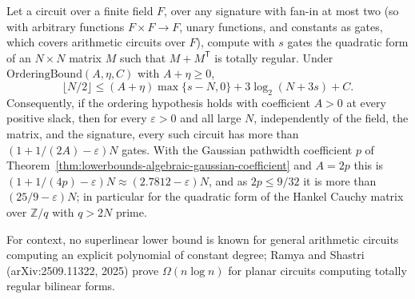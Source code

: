 \begin{theorem}
  \label{thm:lowerbounds-algebraic-quadratic}
  \leanok
  Let a circuit over a finite field $F$, over any signature with fan-in at
  most two (so with arbitrary functions $F\times F\to F$, unary functions,
  and constants as gates, which covers arithmetic circuits over $F$), compute
  with $s$ gates the quadratic form of an $N\times N$ matrix $M$ such that
  $M+M^{\mathsf T}$ is totally regular. Under
  $\mathrm{OrderingBound}(A,\eta,C)$ with $A+\eta\ge0$,
  \[
    \lfloor N/2\rfloor \le (A+\eta)\max\{s-N,0\} + 3\log_2(N+3s) + C .
  \]
  Consequently, if the ordering hypothesis holds with coefficient $A>0$ at
  every positive slack, then for every $\varepsilon>0$ and all large $N$,
  independently of the field, the matrix, and the signature, every such
  circuit has more than $(1+1/(2A)-\varepsilon)N$ gates. With the Gaussian
  pathwidth coefficient $p$ of
  Theorem~\ref{thm:lowerbounds-algebraic-gaussian-coefficient} and $A=2p$
  this is $(1+1/(4p)-\varepsilon)N\approx(2.7812-\varepsilon)N$, and as
  $2p\le9/32$ it is more than $(25/9-\varepsilon)N$; in particular for the
  quadratic form of the Hankel Cauchy matrix over $\mathbb{Z}/q$ with $q>2N$
  prime.

  For context, no superlinear lower bound is known for general arithmetic
  circuits computing an explicit polynomial of constant degree; Ramya and
  Shastri (arXiv:2509.11322, 2025) prove $\Omega(n\log n)$ for planar
  circuits computing totally regular bilinear forms.
\end{theorem}
